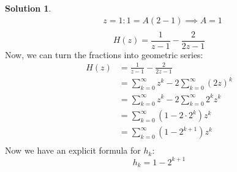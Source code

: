 \documentclass{article}
\theoremstyle{definition}
\newtheorem*{solution}{Solution}
\begin{document}
\begin{solution}
\begin{align*}
&z = 1: 1 = A(2 - 1) \implies A = 1 \\
\end{align*}
$$ H(z) = \frac{1}{z - 1} - \frac{2}{2z - 1} $$
Now, we can turn the fractions into geometric series:
\begin{align*}
H(z) &= \frac{1}{z - 1} - \frac{2}{2z - 1} \\
&= \sum_{k=0}^{\infty} z^k - 2 \sum_{k=0}^{\infty} (2z)^k \\
&= \sum_{k=0}^{\infty} z^k - 2 \sum_{k=0}^{\infty} 2^k z^k \\
&= \sum_{k=0}^{\infty} (1 - 2 \cdot 2^k) z^k \\
&= \sum_{k=0}^{\infty} (1 - 2^{k+1}) z^k \\
\end{align*}
Now we have an explicit formula for $h_k$:
$$ h_k = 1 - 2^{k+1} $$

\end{solution}
\end{document}
